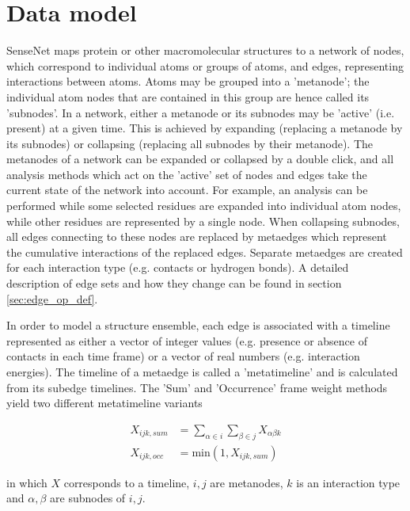 \section{Data model}

SenseNet maps protein or other macromolecular structures to a network of nodes, which correspond to individual atoms or groups of atoms, and edges, representing interactions between atoms. Atoms may be grouped into a 'metanode'; the individual atom nodes that are contained in this group are hence called its 'subnodes'. In a network, either a metanode or its subnodes may be 'active' (i.e. present) at a given time. This is achieved by expanding (replacing a metanode by its subnodes) or collapsing (replacing all subnodes by their metanode). The metanodes of a network can be expanded or collapsed by a double click, and all analysis methods which act on the 'active' set of nodes and edges take the current state of the network into account. For example, an analysis can be performed while some selected residues are expanded into individual atom nodes, while other residues are represented by a single node. When collapsing subnodes, all edges connecting to these nodes are replaced by metaedges which represent the cumulative interactions of the replaced edges. Separate metaedges are created for each interaction type (e.g. contacts or hydrogen bonds). A detailed description of edge sets and how they change can be found in section \ref{sec:edge_op_def}.

In order to model a structure ensemble, each edge is associated with a timeline represented as either a vector of integer values (e.g. presence or absence of contacts in each time frame) or a vector of real numbers (e.g. interaction energies). The timeline of a metaedge is called a 'metatimeline' and is calculated from its subedge timelines. The 'Sum' and 'Occurrence' frame weight methods yield two different metatimeline variants

\begin{equation}
  \label{eq:metatimelines}
  \begin{split}
    X_{ijk,sum} &= \sum_{\alpha \in i} \sum_{\beta \in j} X_{\alpha \beta k} \\
    X_{ijk,occ} &= \text{min}(1,X_{ijk,sum})
  \end{split}
\end{equation}

in which $X$ corresponds to a timeline, $i,j$ are metanodes, $k$ is an interaction type and $\alpha ,\beta$ are subnodes of $i,j$.

